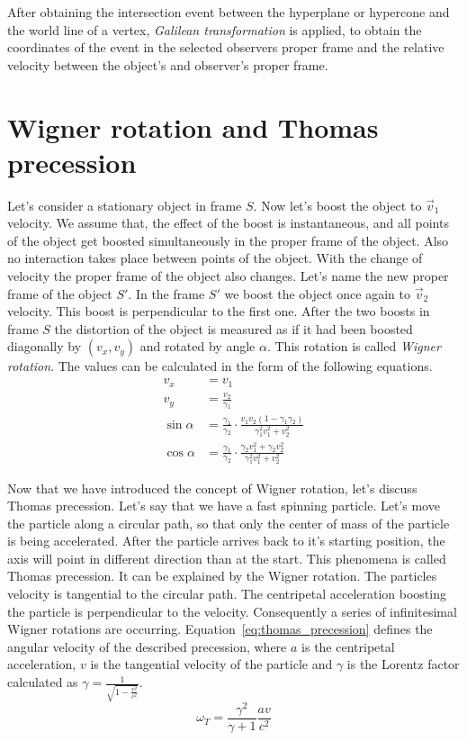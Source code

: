 \documentclass{egpubl}
\begin{document}
After obtaining the intersection event between the hyperplane or hypercone and the world line of a vertex, \emph{Galilean transformation} is applied, to obtain the coordinates of the event in the selected observers proper frame and the relative velocity between the object's and observer's proper frame.

\section{Wigner rotation and Thomas precession}
\label{sec:wigner_rotation}
Let's consider a stationary object in frame $S$. Now let's boost the object to $\vec{v}_1$ velocity. We assume that, the effect of the boost is instantaneous, and all points of the object get boosted simultaneously in the proper frame of the object. Also no interaction takes place between points of the object. With the change of velocity the proper frame of the object also changes. Let's name the new proper frame of the object $S'$. In the frame $S'$ we boost the object once again to $\vec{v}_2$ velocity. This boost is perpendicular to the first one. After the two boosts in frame $S$ the distortion of the object is measured as if it had been boosted diagonally by $(v_x, v_y)$ and rotated by angle $\alpha$. This rotation is called \emph{Wigner rotation}. The values can be calculated in the form of the following equations.
\begin{align}
v_x &= v_1 \label{eq:wigner_rotation_1}\\
v_y &= \frac{v_2}{\gamma{}_1} \label{eq:wigner_rotation_2}\\
\sin{\alpha} &= \frac{\gamma{}_1}{\gamma{}_2}\cdot\frac{v_1v_2(1-\gamma{}_1\gamma{}_2)}{\gamma{}_1^2v_1^2+v_2^2} \label{eq:wigner_rotation_3}\\
\cos{\alpha} &= \frac{\gamma{}_1}{\gamma{}_2}\cdot\frac{\gamma{}_2v_1^2+\gamma{}_2v_2^2}{\gamma{}_1^2v_1^2+v_2^2} \label{eq:wigner_rotation_4}
\end{align}

Now that we have introduced the concept of Wigner rotation, let's discuss Thomas precession. Let's say that we have a fast spinning particle. Let's move the particle along a circular path, so that only the center of mass of the particle is being accelerated. After the particle arrives back to it's starting position, the axis will point in different direction than at the start.
This phenomena is called Thomas precession. It can be explained by the Wigner rotation. The particles velocity is tangential to the circular path. The centripetal acceleration boosting the particle is perpendicular to the velocity. Consequently a series of infinitesimal Wigner rotations are occurring.
Equation~\ref{eq:thomas_precession} defines the angular velocity of the described precession, where $a$ is the centripetal acceleration, $v$ is the tangential velocity of the particle and $\gamma$ is the Lorentz factor calculated as $\gamma = \frac{1}{\sqrt{1-\frac{v^2}{c^2}}}$.
\begin{equation}
\omega{}_T=\frac{\gamma{}^2}{\gamma + 1}\frac{av}{c^2}
\label{eq:thomas_precession}
\end{equation}
\end{document}
